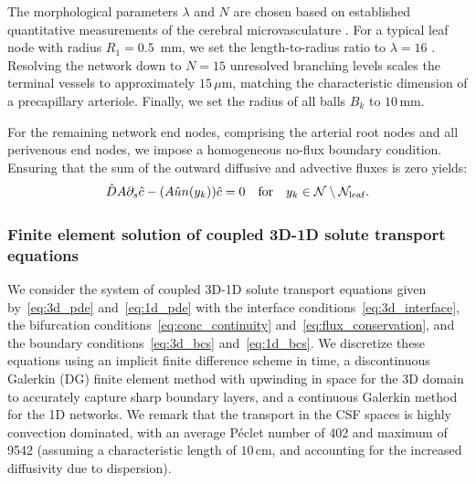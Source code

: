 \documentclass[fleqn,10pt]{wlscirep}
\begin{document}
The morphological parameters $\lambda$ and $N$ are chosen based on established quantitative measurements of the cerebral microvasculature \cite{cassot2006novel, lorthois2014tortuosity}. For a typical leaf node with radius $R_1 = 0.5\,$ mm, we set the length-to-radius ratio to $\lambda = 16$ \cite{lorthois2014tortuosity}. Resolving the network down to $N = 15$ unresolved branching levels scales the terminal vessels to approximately $15 \, \mu$m, matching the characteristic dimension of a precapillary arteriole. Finally, we set the radius of all balls $B_k$ to $10\,$mm.

For the remaining network end nodes, comprising the arterial root nodes and all perivenous end nodes, we impose a homogeneous no-flux boundary condition. Ensuring that the sum of the outward diffusive and advective fluxes is zero yields:
\begin{equation}
  \hat{D}A \partial_s \hat{c} - (A \hat{u} n(y_k)) \hat{c} = 0 \quad \mathrm{for} \quad y_k \in \mathcal{N} \setminus \mathcal{N}_{\rm leaf}.
  \label{eq:1d_noflux}
\end{equation}

\subsubsection{Finite element solution of coupled 3D-1D solute transport equations}
We consider the system of coupled 3D-1D solute transport equations
given by~\eqref{eq:3d_pde} and~\eqref{eq:1d_pde} with the interface
conditions~\eqref{eq:3d_interface}, the bifurcation
conditions~\eqref{eq:conc_continuity}
and~\eqref{eq:flux_conservation}, and the boundary
conditions~\eqref{eq:3d_bcs} and~\eqref{eq:1d_bcs}. We discretize
these equations using an implicit finite difference scheme in time, 
a discontinuous Galerkin (DG) finite element method with upwinding in space for the 3D domain to accurately capture sharp boundary layers, and a continuous Galerkin method for the 1D networks. We remark that the transport in the CSF spaces is highly convection dominated, with an average Péclet number of 402 and maximum of 9542 (assuming a characteristic length of $10\,$cm, and accounting for the increased diffusivity due to dispersion).
\end{document}
